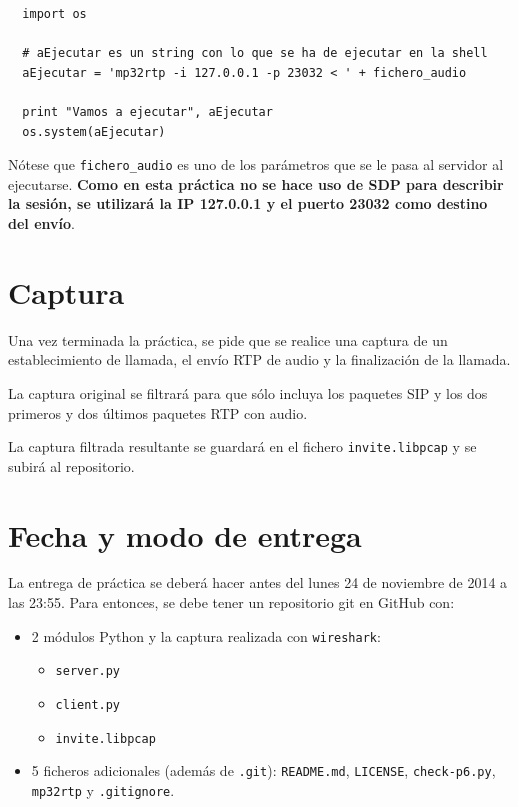 \documentclass[a4paper,11pt]{article}
\begin{document}
\begin{verbatim}
  import os

  # aEjecutar es un string con lo que se ha de ejecutar en la shell
  aEjecutar = 'mp32rtp -i 127.0.0.1 -p 23032 < ' + fichero_audio 

  print "Vamos a ejecutar", aEjecutar
  os.system(aEjecutar)
\end{verbatim}

Nótese que \texttt{fichero\_audio} es uno de los parámetros que se le pasa al servidor al ejecutarse. {\bf Como en esta práctica no se hace uso de SDP para 
describir la sesión, se utilizará la IP 127.0.0.1 y el puerto 23032 como
destino del envío}.

\section*{Captura}

Una vez terminada la práctica, se pide que se realice una captura de un
establecimiento de llamada, el envío RTP de audio y la finalización de
la llamada. 

La captura original se filtrará para que sólo incluya los paquetes
SIP y los dos primeros y dos últimos paquetes RTP con audio.

La captura filtrada resultante se guardará en el fichero \texttt{invite.libpcap}
y se subirá al repositorio.


\section*{Fecha y modo de entrega}

La entrega de práctica se deberá hacer antes del lunes 24 de noviembre de 2014 a las 23:55. Para entonces, se debe tener un repositorio git en GitHub con: 

\begin{itemize}
    \item 2 módulos Python y la captura realizada con \texttt{wireshark}:
    \begin{itemize}
      \item \texttt{server.py}
      \item \texttt{client.py}
      \item \texttt{invite.libpcap}
    \end{itemize}
    \item 5 ficheros adicionales (además de \texttt{.git}): \texttt{README.md}, \texttt{LICENSE}, \texttt{check-p6.py}, \texttt{mp32rtp} y \texttt{.gitignore}.
\end{itemize}
\end{document}
